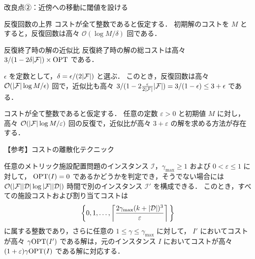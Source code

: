 \begin{frame}{改良点②：近傍への移動に閾値を設ける}
	\begin{block}{反復回数の上界}
		コストが全て整数であると仮定する．
		初期解のコストを \(M\) とすると，反復回数は高々 \(\mathcal{O}(\log{M}/ \delta)\) 回である．
	\end{block}

	\begin{block}{反復終了時の解の近似比}
		反復終了時の解の総コストは高々 \(3 / (1 - 2\delta|\mathcal{F}|) \times \text{\upshape OPT}\) である．
	\end{block}

	\(\epsilon\) を定数として，\(\delta = \epsilon / (2|\mathcal{F}|)\) と選ぶ．
	このとき，反復回数は高々 \(\mathcal{O}(|\mathcal{F}| \log{M} / \epsilon)\) 回で，近似比も高々 \(3/(1 - 2\frac{\epsilon}{2|\mathcal{F}|}|\mathcal{F}|) = 3/(1 - \epsilon) \le 3 + \epsilon\) である．

	\begin{lemma}[閾値付きの近傍探索による反復回数と近似比]
		コストが全て整数であると仮定する．
		任意の定数 \(\varepsilon > 0\) と初期値 \(M\) に対し，高々 \(\mathcal{O}(|\mathcal{F}| \log{M} / \varepsilon)\) 回の反復で，近似比が高々 \(3 + \varepsilon\) の解を求める方法が存在する．
	\end{lemma}

	\note{
		\begin{itemize}
			\item
		\end{itemize}
	}
\end{frame}

\begin{frame}{【参考】コストの離散化テクニック}

	\begin{lemma}
		任意のメトリック施設配置問題のインスタンス \(\mathcal{I}\)，\(\gamma_{\max} \ge 1\) および \(0 < \varepsilon \le 1\) に対して，
		\(\text{\upshape OPT}(I) = 0\) であるかどうかを判定でき，そうでない場合には \(\mathcal{O}(|\mathcal{F}||\mathcal{D}|\log{|\mathcal{F}||\mathcal{D}|})\) 時間で別のインスタンス \(\mathcal{I}'\) を構成できる．
		このとき，すべての施設コストおよび割り当てコストは
		\[
			\biggr\{ 0, 1, \ldots, \left\lceil \frac{2\gamma_{\max}(k + |\mathcal{D}|)^3}{\varepsilon} \right\rceil \biggl\}
		\]
		に属する整数であり，さらに任意の \(1 \le \gamma \le \gamma_{\max}\) に対して，
		\(I'\) においてコストが高々 \(\gamma \text{\upshape OPT}(I')\) である解は，元のインスタンス \(I\) においてコストが高々 \((1 + \varepsilon)\gamma \text{\upshape OPT}(I)\) である解に対応する．
	\end{lemma}
\end{frame}

